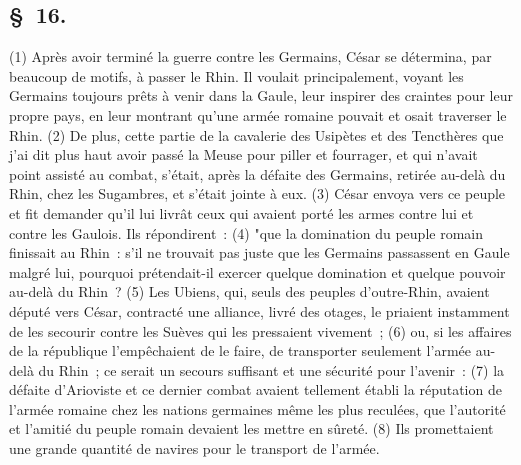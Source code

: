 \documentclass[french,twoside]{book} %
\begin{document}
\subsection[{§ 16.}]{ \textsc{§ 16.} }
\noindent (1) Après avoir terminé la guerre contre les Germains, César se détermina, par beaucoup de motifs, à passer le Rhin. Il voulait principalement, voyant les Germains toujours prêts à venir dans la Gaule, leur inspirer des craintes pour leur propre pays, en leur montrant qu’une armée romaine pouvait et osait traverser le Rhin. (2) De plus, cette partie de la cavalerie des Usipètes et des Tencthères que j’ai dit plus haut avoir passé la Meuse pour piller et fourrager, et qui n’avait point assisté au combat, s’était, après la défaite des Germains, retirée au-delà du Rhin, chez les Sugambres, et s’était jointe à eux. (3) César envoya vers ce peuple et fit demander qu’il lui livrât ceux qui avaient porté les armes contre lui et contre les Gaulois. Ils répondirent : (4) "que la domination du peuple romain finissait au Rhin : s’il ne trouvait pas juste que les Germains passassent en Gaule malgré lui, pourquoi prétendait-il exercer quelque domination et quelque pouvoir au-delà du Rhin ? (5) Les Ubiens, qui, seuls des peuples d’outre-Rhin, avaient député vers César, contracté une alliance, livré des otages, le priaient instamment de les secourir contre les Suèves qui les pressaient vivement ; (6) ou, si les affaires de la république l’empêchaient de le faire, de transporter seulement l’armée au-delà du Rhin ; ce serait un secours suffisant et une sécurité pour l’avenir : (7) la défaite d’Arioviste et ce dernier combat avaient tellement établi la réputation de l’armée romaine chez les nations germaines même les plus reculées, que l’autorité et l’amitié du peuple romain devaient les mettre en sûreté. (8) Ils promettaient une grande quantité de navires pour le transport de l’armée.
\end{document}
